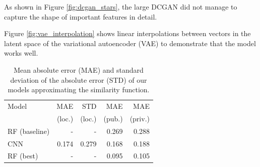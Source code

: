 \documentclass[10pt,conference,compsocconf]{IEEEtran}
\begin{document}
As shown in Figure \ref{fig:dcgan_stars}, the large DCGAN did not manage to capture the shape of important features in detail. %

Figure \ref{fig:vae_interpolation} shows linear interpolations between vectors in the latent space of the variational autoencoder (VAE) to demonstrate that the model works well. %


\begin{table}\centering
    \begin{tabular}{lrr|rr}
    \toprule
        Model           & MAE           & STD           &  MAE          &  MAE \\
                        & (loc.)        & (loc.)        & (pub.)        & (priv.) \\
    \midrule
        RF (baseline)   & -             & -             & \SI{0.269}{}  & \SI{0.288}{} \\
        CNN             & \SI{0.174}{}  & \SI{0.279}{}  & \SI{0.168}{}  & \SI{0.188}{} \\
        RF (best)       & -             & -             & \SI{0.095}{}  & \SI{0.105}{} \\
    \bottomrule
    \end{tabular}
\caption{Mean absolute error (MAE) and standard deviation of the absolute error (STD) of our models approximating the similarity function.}
\label{tab:SFA_MSS}
\end{table}
\end{document}
